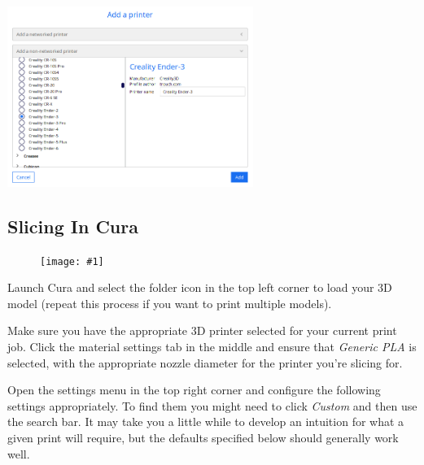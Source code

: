 \documentclass[12pt]{report}
\newcommand{\imageright}[2]{
    \begin{figure}
        \centering
        \texttt{[image: \#1]}
        \vspace*{-1cm}
    \end{figure}
}
\begin{document}
\begin{center}
    \includegraphics[width=0.6\textwidth]{add_printer.png}
\end{center}

\pagebreak

{

\subsection*{Slicing In Cura}
\label{sec:slicing}

\imageright{slicing_settings.png}{0.25}

Launch Cura and select the folder icon in the top left corner to load your 3D
model (repeat this process if you want to print multiple models). \par
Make sure you have the appropriate 3D printer selected for your current print
job. Click the material settings tab in the middle and ensure that
\textit{Generic PLA} is selected, with the appropriate nozzle diameter for the
printer you're slicing for. \par
Open the settings menu in the top right corner and configure the following
settings appropriately. To find them you might need to click \textit{Custom} and
then use the search bar. It may take you a little while to develop an intuition
for what a given print will require, but the defaults specified below should
generally work well.

}
\end{document}
